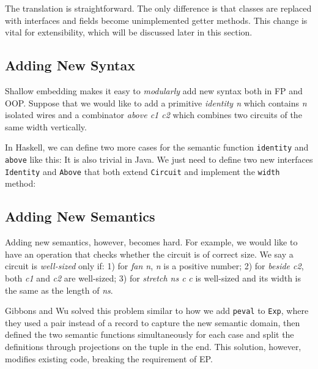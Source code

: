 The translation is straightforward. The only difference is that classes are
replaced with interfaces and fields become unimplemented getter methods. This
change is vital for extensibility, which will be discussed later in this section.

\subsection{Adding New Syntax}
Shallow embedding makes it easy to \emph{modularly} add new syntax both in FP and OOP.
Suppose that we would like to add a primitive \emph{identity n} which contains
\emph{n} isolated wires and a combinator \emph{above c1 c2} which combines two
circuits of the same width vertically.

In Haskell, we can define two more cases for the semantic function \texttt{identity} and
\texttt{above} like this:
It is also trivial in Java. We just need to define two new interfaces
\texttt{Identity} and \texttt{Above} that both extend \texttt{Circuit} and
implement the \texttt{width} method:



\subsection{Adding New Semantics}
Adding new semantics, however, becomes hard.
For example, we would like to have an operation that checks
whether the circuit is of correct size. We say a circuit is \emph{well-sized}
only if: 1) for \emph{fan n}, \emph{n} is a positive number; 2) for
\emph{beside c2}, both \emph{c1} and \emph{c2} are well-sized; 3) for
\emph{stretch ns c} \emph{c} is well-sized and its width is the same as the
length of \emph{ns}.

Gibbons and Wu solved this problem similar to how we add \texttt{peval} to
\texttt{Exp}, where they used a pair instead of a record to capture the new
semantic domain, then defined the two semantic functions simultaneously for each
case and split the definitions through projections on the tuple in the end.
This solution, however, modifies existing code, breaking the requirement of EP.

